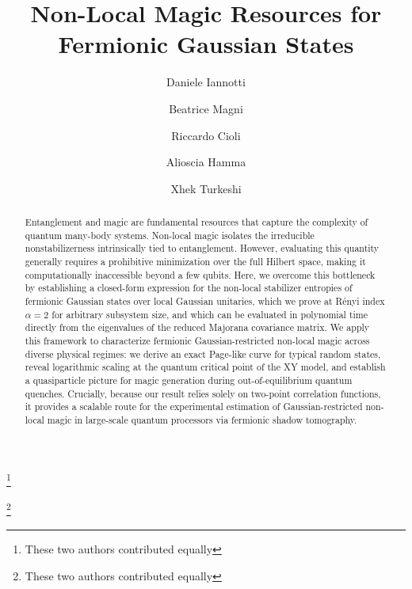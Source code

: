 \documentclass[prx,twocolumn,superscriptaddress,aps,10pt, frontmatterverbose, reprint,footinbib,longbibliography=true]{revtex4-2}
\begin{document}

\title{Non-Local Magic Resources for Fermionic Gaussian States}

\author{Daniele Iannotti}
\thanks{These two authors contributed equally}



\author{Beatrice Magni}
\thanks{These two authors contributed equally}

\author{Riccardo Cioli}


\author{Alioscia Hamma}


\author{Xhek Turkeshi}


\begin{abstract}
Entanglement and magic are fundamental resources that capture the complexity of quantum many-body systems. Non-local magic isolates the irreducible nonstabilizerness intrinsically tied to entanglement. However, evaluating this quantity generally requires a prohibitive minimization over the full Hilbert space, making it computationally inaccessible beyond a few qubits. Here, we overcome this bottleneck by establishing a closed-form expression for the non-local stabilizer entropies of fermionic Gaussian states over local Gaussian unitaries, which we prove at R\'enyi index $\alpha=2$ for arbitrary subsystem size, and which can be evaluated in polynomial time directly from the eigenvalues of the reduced Majorana covariance matrix. We apply this framework to characterize fermionic Gaussian-restricted non-local magic across diverse physical regimes: we derive an exact Page-like curve for typical random states, reveal logarithmic scaling at the quantum critical point of the XY model, and establish a quasiparticle picture for magic generation during out-of-equilibrium quantum quenches. Crucially, because our result relies solely on two-point correlation functions, it provides a scalable route for the experimental estimation of Gaussian-restricted non-local magic in large-scale quantum processors via fermionic shadow tomography.
\end{abstract}
\end{document}
